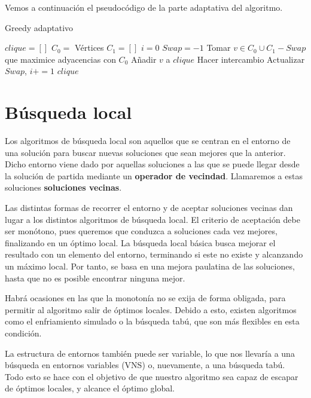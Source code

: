 Vemos a continuación el pseudocódigo de la parte adaptativa del algoritmo.

\begin{algorithm}[H]
\caption{Greedy adaptativo}
  \begin{algorithmic}
  \State $clique = [ ]$
  \State $C_0 = $ Vértices
  \State $C_1 = [ ]$
  \State $i = 0$
  \State $Swap = -1$
  \Repeat
    \State Tomar $v \in C_0 \cup C_1 - Swap$ que maximice adyacencias con $C_0$
      \State Añadir $v$ a $clique$
    \Else
      \State Hacer intercambio
      \State Actualizar $Swap$, $i += 1$
    \EndIf
  \Return $clique$
  \EndFunction
  \end{algorithmic}
\end{algorithm}


\section{Búsqueda local}\label{busquedalocal}

Los algoritmos de búsqueda local son aquellos que se centran en el entorno de una
solución para buscar nuevas soluciones que sean mejores que la anterior. Dicho entorno
viene dado por aquellas soluciones a las que se puede llegar desde la solución de
partida mediante un \textbf{operador de vecindad}. Llamaremos a estas soluciones
\textbf{soluciones vecinas}.

Las distintas formas de recorrer el entorno y de aceptar soluciones vecinas dan
lugar a los distintos algoritmos de búsqueda local. El criterio de aceptación debe
ser monótono, pues queremos que conduzca a soluciones cada vez mejores, finalizando
en un óptimo local. La búsqueda local básica busca mejorar el resultado con un elemento
del entorno, terminando si este no existe y alcanzando un máximo local. Por tanto, se
basa en una mejora paulatina de las soluciones, hasta que no es posible encontrar
ninguna mejor.

Habrá ocasiones en las que la monotonía no se exija de forma obligada, para permitir
al algoritmo salir de óptimos locales. Debido a esto, existen algoritmos como el
enfriamiento simulado o la búsqueda tabú, que son más flexibles en esta condición.

La estructura de entornos también puede ser variable, lo que nos llevaría a una
búsqueda en entornos variables (VNS) o, nuevamente, a una búsqueda tabú.
Todo esto se hace con el objetivo de que nuestro  algoritmo sea capaz de escapar
de óptimos locales, y alcance el óptimo global.

